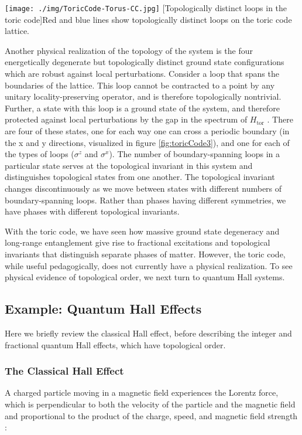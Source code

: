 \begin{centering}
\texttt{[image: ./img/ToricCode-Torus-CC.jpg]}
  \captionsetup{width=0.75\textwidth}
  [Topologically distinct loops in the toric code]{Red and blue lines show topologically distinct loops on the toric code lattice.}
  \label{fig:toricCode3}
\end{centering}

Another physical realization of the topology of the system is the four energetically degenerate but topologically distinct ground state configurations which are robust against local perturbations. Consider a loop that spans the boundaries of the lattice. This loop cannot be contracted to a point by any unitary locality-preserving operator, and is therefore topologically nontrivial. Further, a state with this loop is a ground state of the system, and therefore protected against local perturbations by the gap in the spectrum of $H_{\text{tor}}$ \cite{Bravyi2010}. There are four of these states, one for each way one can cross a periodic boundary (in the x and y directions, visualized in figure \ref{fig:toricCode3}), and one for each of the types of loops ($\sigma^{z}$ and $\sigma^{x}$). The number of boundary-spanning loops in a particular state serves at the topological invariant in this system and distinguishes topological states from one another. The topological invariant changes discontinuously as we move between states with different numbers of boundary-spanning loops. Rather than phases having different symmetries, we have phases with different topological invariants.

With the toric code, we have seen how massive ground state degeneracy and long-range entanglement give rise to fractional excitations and topological invariants that distinguish separate phases of matter. However, the toric code, while useful pedagogically, does not currently have a physical realization. To see physical evidence of topological order, we next turn to quantum Hall systems.

\subsection{Example: Quantum Hall Effects}

Here we briefly review the classical Hall effect, before describing the integer and fractional quantum Hall effects, which have topological order.

\subsubsection{The Classical Hall Effect}
A charged particle moving in a magnetic field experiences the Lorentz force, which is perpendicular to both the velocity of the particle and the magnetic field and proportional to the product of the charge, speed, and magnetic field strength \cite{Griffiths1999}:

